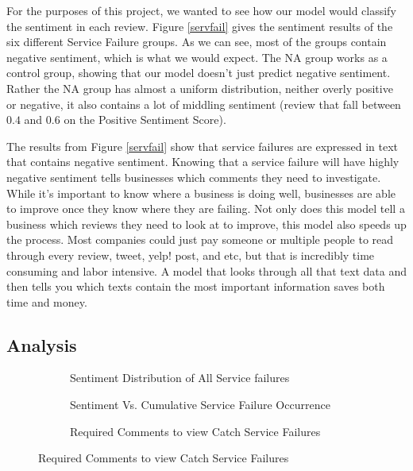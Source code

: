 \documentclass[titlepage,letterpaper]{article}
\begin{document}
For the purposes of this project, we wanted to see how our model would classify the sentiment in each review. Figure \ref{servfail} gives the sentiment results of the six different Service Failure groups. As we can see, most of the groups contain negative sentiment, which is what we would expect. The NA group works as a control group, showing that our model doesn't just predict negative sentiment. Rather the NA group has almost a uniform distribution, neither overly positive or negative, it also contains a lot of middling sentiment (review that fall between $0.4$ and $0.6$ on the Positive Sentiment Score).

The results from Figure \ref{servfail} show that service failures are expressed in text that contains negative sentiment. Knowing that a service failure will have highly negative sentiment tells businesses which comments they need to investigate. While it's important to know where a business is doing well, businesses are able to improve once they know where they are failing. Not only does this model tell a business which reviews they need to look at to improve, this model also speeds up the process. Most companies could just pay someone or multiple people to read through every review, tweet, yelp! post, and etc, but that is incredibly time consuming and labor intensive. A model that looks through all that text data and then tells you which texts contain the most important information saves both time and money.  






\subsection{Analysis}


\begin{figure}[]
	\caption{\ }\label{filler}
		\vspace*{-1.6in}
		\begin{adjustwidth*}{-1in}{-1in}
\begin{subfigure}{16cm}
\caption{Sentiment Distribution of All Service failures}
\label{all}

\end{subfigure}

\begin{subfigure}{16cm}
		\centering
		\caption{Sentiment Vs. Cumulative Service Failure Occurrence}
		\label{sentivfail}
		
\end{subfigure}

\begin{subfigure}{16cm}
		\centering
		\caption{Required Comments to view Catch  Service Failures}
		\label{sentichick}
		
\end{subfigure}
	\end{adjustwidth*}
\end{figure}
\end{document}
